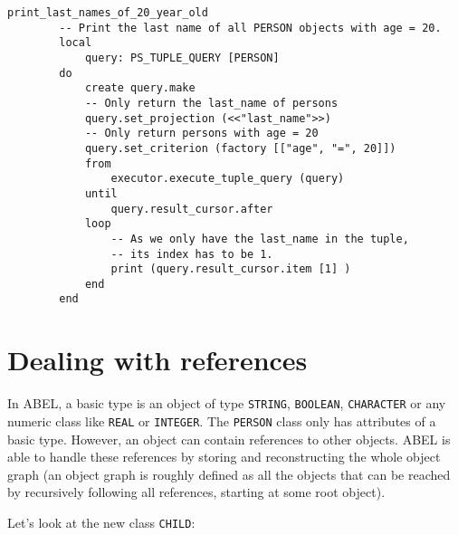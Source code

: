 \documentclass[a4paper,12pt]{report}
\begin{document}
\begin{lstlisting}[language=OOSC2Eiffel, captionpos=b, caption={Using tuple queries with criteria.}, label={lst:tuple_projection_selection}]
	print_last_names_of_20_year_old
		-- Print the last name of all PERSON objects with age = 20.
		local
			query: PS_TUPLE_QUERY [PERSON]
		do
			create query.make
			-- Only return the last_name of persons
			query.set_projection (<<"last_name">>)
			-- Only return persons with age = 20
			query.set_criterion (factory [["age", "=", 20]])
			from
				executor.execute_tuple_query (query)
			until
				query.result_cursor.after
			loop
				-- As we only have the last_name in the tuple,
				-- its index has to be 1.
				print (query.result_cursor.item [1] )
			end			
		end
\end{lstlisting}

\chapter{Dealing with references}
\label {chapter:references}

In ABEL, a basic type is an object of type \lstinline!STRING!, \lstinline!BOOLEAN!, \lstinline!CHARACTER! or any numeric class like \lstinline!REAL! or \lstinline!INTEGER!.
The \lstinline!PERSON! class only has attributes of a basic type. However, an object can contain references to other objects. ABEL is able to handle these references by storing and reconstructing the whole object graph (an object graph is roughly defined as all the objects that can be reached by recursively following all references, starting at some root object).

Let's look at the new class \lstinline!CHILD!:
\end{document}

